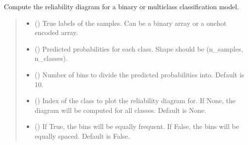 \documentclass[letterpaper,10pt,english]{sphinxmanual}
\begin{document}
\begin{fulllineitems}
\label{\detokenize{calzone:calzone.utils.reliability_diagram}}
\pysigstartsignatures
{}
\pysigstopsignatures
\sphinxAtStartPar
Compute the reliability diagram for a binary or multi\sphinxhyphen{}class classification model.
\begin{quote}\begin{description}
\begin{itemize}
\item {} 
\sphinxAtStartPar
{} () \textendash{} True labels of the samples. Can be a binary array or a one\sphinxhyphen{}hot encoded array.

\item {} 
\sphinxAtStartPar
{} () \textendash{} Predicted probabilities for each class. Shape should be (n\_samples, n\_classes).

\item {} 
\sphinxAtStartPar
{} () \textendash{} Number of bins to divide the predicted probabilities into. Default is 10.

\item {} 
\sphinxAtStartPar
{} () \textendash{} Index of the class to plot the reliability diagram for. If None, the diagram will be computed for all classes. Default is None.

\item {} 
\sphinxAtStartPar
{} () \textendash{} If True, the bins will be equally frequent. If False, the bins will be equally spaced. Default is False.


\end{itemize}
\end{description}
\end{quote}
\end{fulllineitems}
\end{document}
